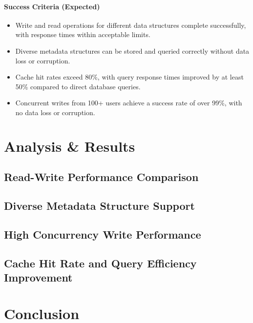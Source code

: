 \documentclass{article}
\begin{document}
\paragraph{Success Criteria (Expected)}
\begin{itemize}
    \item Write and read operations for different data structures complete successfully, with response times within acceptable limits.
    \item Diverse metadata structures can be stored and queried correctly without data loss or corruption.
    \item Cache hit rates exceed 80\%, with query response times improved by at least 50\% compared to direct database queries.
    \item Concurrent writes from 100+ users achieve a success rate of over 99\%, with no data loss or corruption.
\end{itemize}

\section{Analysis \& Results}

\subsection{Read-Write Performance Comparison}



\subsection{Diverse Metadata Structure Support}

\subsection{High Concurrency Write Performance}

\subsection{Cache Hit Rate and Query Efficiency Improvement}

\section{Conclusion}
\end{document}
